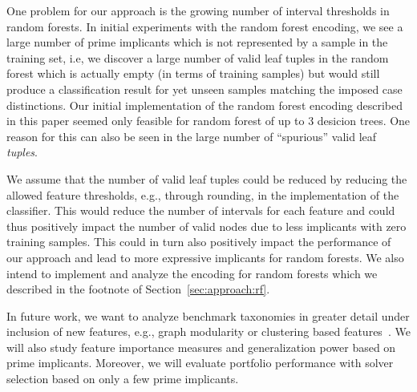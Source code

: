 \documentclass{easychair}
\theoremstyle{definition}
\begin{document}
One problem for our approach is the growing number of interval thresholds in random forests. 
In initial experiments with the random forest encoding, we see a large number of prime implicants which is not represented by a sample in the training set, i.e, we discover a large number of valid leaf tuples in the random forest which is actually empty (in terms of training samples) but would still produce a classification result for yet unseen samples matching the imposed case distinctions. 
Our initial implementation of the random forest encoding described in this paper seemed only feasible for random forest of up to 3 desicion trees. 
One reason for this can also be seen in the large number of ``spurious'' valid leaf \emph{tuples}. 

We assume that the number of valid leaf tuples could be reduced by reducing the allowed feature thresholds, e.g., through rounding, in the implementation of the classifier. 
This would reduce the number of intervals for each feature and could thus positively impact the number of valid nodes due to less implicants with zero training samples. 
This could in turn also positively impact the performance of our approach and lead to more expressive implicants for random forests. 
We also intend to implement and analyze the encoding for random forests which we described in the footnote of Section~\ref{sec:approach:rf}. 

In future work, we want to analyze benchmark taxonomies in greater detail under inclusion of new features, e.g., graph modularity or clustering based features~\cite{Ansotegui:2019:Community,Li:2021:Hierarchical}. 
We will also study feature importance measures and generalization power based on prime implicants. 
Moreover, we will evaluate portfolio performance with solver selection based on only a few prime implicants. 



\end{document}
